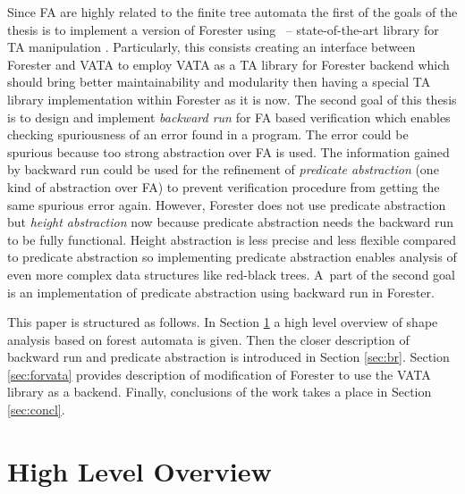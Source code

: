\documentclass[fleqn,11pt]{ExcelAtFIT} %
\begin{document}
Since FA are highly related to the finite tree automata the first of the goals of the thesis is to implement
a version of Forester using \vata\ -- state-of-the-art library for TA manipulation \cite{libvata}.
Particularly, this consists creating an interface between Forester and VATA to employ VATA as a TA library for Forester backend
which should bring better maintainability and modularity then having a special TA library implementation within Forester as it is now.
The second goal of this thesis is to design and implement \emph{backward run} for FA based verification
which enables checking spuriousness of an error found in a program.
The error could be spurious because too strong abstraction over FA is used.
The information gained by backward run could be used for the refinement of \emph{predicate abstraction} (one kind of abstraction over FA)
to prevent verification procedure from getting the same spurious error again.
However, Forester does not use predicate abstraction but \emph{height abstraction} now
because predicate abstraction needs the backward run to be fully functional.
Height abstraction is less precise and less flexible compared to predicate abstraction so implementing predicate abstraction
enables analysis of even more complex data structures like red-black trees.
A~part of the second goal is an implementation of predicate abstraction using backward run in Forester.

This paper is structured as follows.
In Section \ref{sec:overview} a high level overview of shape analysis based on forest automata
is given.
Then the closer description of backward run and predicate abstraction is introduced in Section \ref{sec:br}.
Section \ref{sec:forvata} provides description of modification of Forester to use the VATA library as a backend.
Finally, conclusions of the work takes a place in Section \ref{sec:concl}.

\section{High Level Overview}
\label{sec:overview}
\end{document}

